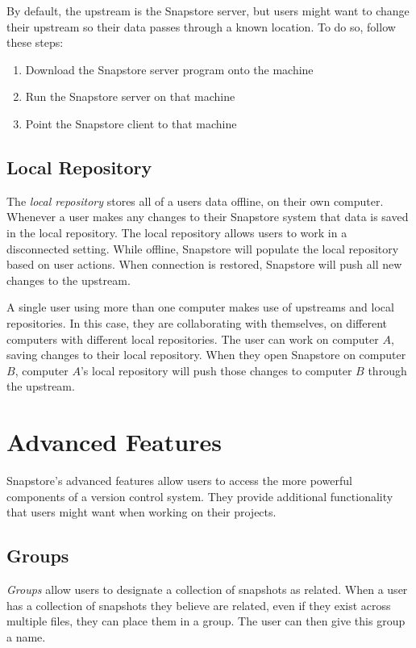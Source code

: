 By default, the upstream is the Snapstore server, but users might want to change their upstream so their data passes through a known location. To do so, follow these steps:
\begin{enumerate}
  \item{Download the Snapstore server program onto the machine}
  \item{Run the Snapstore server on that machine}
  \item{Point the Snapstore client to that machine}
\end{enumerate}

\subsection{Local Repository}

The \textit{local repository} stores all of a users data offline, on their own computer. Whenever a user makes any changes to their Snapstore system that data is saved in the local repository. The local repository allows users to work in a disconnected setting. While offline, Snapstore will populate the local repository based on user actions. When connection is restored, Snapstore will push all new changes to the upstream.

A single user using more than one computer makes use of upstreams and local repositories. In this case, they are collaborating with themselves, on different computers with different local repositories. The user can work on computer $A$, saving changes to their local repository. When they open Snapstore on computer $B$, computer $A$'s local repository will push those changes to computer $B$ through the upstream.

\section{Advanced Features}

Snapstore's advanced features allow users to access the more powerful components of a version control system. They provide additional functionality that users might want when working on their projects.

\subsection{Groups}

\textit{Groups} allow users to designate a collection of snapshots as related. When a user has a collection of snapshots they believe are related, even if they exist across multiple files, they can place them in a group. The user can then give this group a name.

